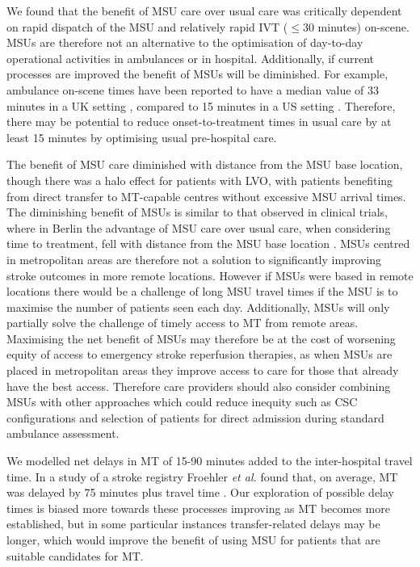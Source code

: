 We found that the benefit of MSU care over usual care was critically dependent on rapid dispatch of the MSU and relatively rapid IVT ($\leq$30 minutes) on-scene. MSUs are therefore not an alternative to the optimisation of day-to-day operational activities in ambulances or in hospital. Additionally, if current processes are improved the benefit of MSUs will be diminished. For example, ambulance on-scene times have been reported to have a median value of 33 minutes in a UK setting \cite{mcclelland_what_2023}, compared to 15 minutes in a US setting \cite{patel_evaluation_2014}. Therefore, there may be potential to reduce onset-to-treatment times in usual care by at least 15 minutes by optimising usual pre-hospital care.

The benefit of MSU care diminished with distance from the MSU base location, though there was a halo effect for patients with LVO, with patients benefiting from direct transfer to MT-capable centres without excessive MSU arrival times. The diminishing benefit of MSUs is similar to that observed in clinical trials, where in Berlin the advantage of MSU care over usual care, when considering time to treatment, fell with distance from the MSU base location \cite{koch_influence_2016}. MSUs centred in metropolitan areas are therefore not a solution to significantly improving stroke outcomes in more remote locations. However if MSUs were based in remote locations there would be a challenge of long MSU travel times if the MSU is to maximise the number of patients seen each day. Additionally, MSUs will only partially solve the challenge of timely access to MT from remote areas. Maximising the net benefit of MSUs may therefore be at the cost of worsening equity of access to emergency stroke reperfusion therapies, as when MSUs are placed in metropolitan areas they improve access to care for those that already have the best access. Therefore care providers should also consider combining MSUs with other approaches which could reduce inequity such as CSC configurations and selection of patients for direct admission during standard ambulance assessment. 

We modelled net delays in MT of 15-90 minutes added to the inter-hospital travel time. In a study of a stroke registry Froehler \textit{et al.} found that, on average, MT was delayed by 75 minutes plus travel time \cite{ froehler_interhospital_2017}. Our exploration of possible delay times is biased more towards these processes improving as MT becomes more established, but in some particular instances transfer-related delays may be longer, which would improve the benefit of using MSU for patients that are suitable candidates for MT.

